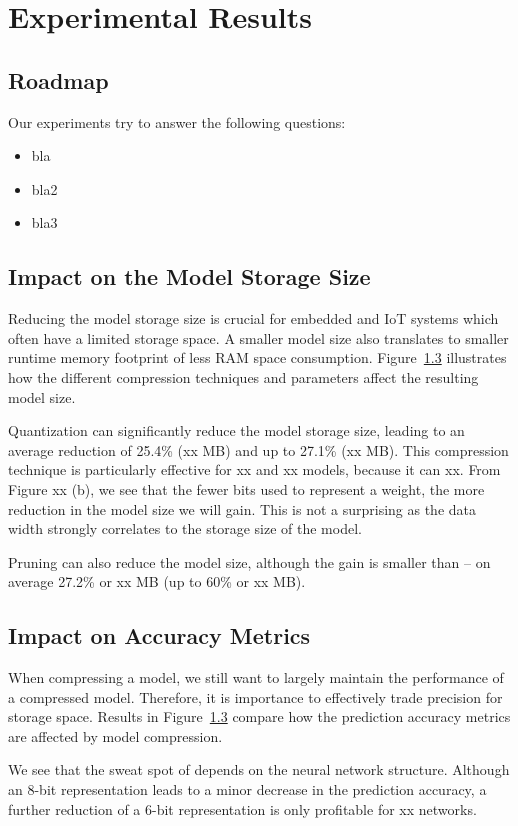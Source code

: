 \section{Experimental Results}


\subsection{Roadmap}
Our experiments try to answer the following questions:

\begin{itemize}
\item bla
\item bla2
\item bla3
\end{itemize}

\subsection{Impact on the Model Storage Size}
Reducing the model storage size is crucial for embedded and IoT systems which often have a limited storage space. A smaller model size also
translates to smaller runtime memory footprint of less RAM space consumption. Figure~\ref{} illustrates how the different compression
techniques and parameters affect the resulting model size.

Quantization can significantly reduce the model storage size, leading to an average reduction of 25.4\% (xx MB) and up to 27.1\% (xx MB). This
compression technique is particularly effective for xx and xx models, because it can xx. From Figure xx (b), we see that the fewer bits
used to represent a weight, the more reduction in the model size we will gain. This is not a surprising as the data width strongly
correlates to the storage size of the model.


Pruning can also reduce the model size, although the gain is smaller than \quantization -- on average 27.2\% or xx MB (up to 60\% or xx MB).


\subsection{Impact on Accuracy Metrics}
When compressing a model, we still want to largely maintain the performance of a compressed model. Therefore, it is importance to
effectively trade precision for storage space. Results in Figure~\ref{} compare how the prediction accuracy metrics are affected by model
compression.

We see that the sweat spot of \quantization depends on the neural network structure. Although an 8-bit representation leads to a minor
decrease in the prediction accuracy, a further reduction of a 6-bit representation is only profitable for xx networks.

